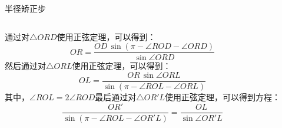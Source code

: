 \documentclass[aspectratio=169]{beamer}
\begin{document}
\begin{frame}{半径矫正步}
\begin{columns}
        通过对$\bigtriangleup ORD$使用正弦定理，可以得到：
        \begin{equation}
            OR = \frac{OD\,\sin\left(\pi - \angle ROD - \angle ORD\right)}{\sin \angle ORD}
        \end{equation}
        然后通过对$\bigtriangleup ORL$使用正弦定理，可以得到：
        \begin{equation}
            OL = \frac{OR\,\sin{\angle ORL}}{\sin\left(\pi - \angle ROL - \angle ORL\right)}
        \end{equation}
        其中，$\angle ROL = 2\angle ROD$最后通过对$\bigtriangleup OR'L$使用正弦定理，可以得到方程：
        \begin{equation}
            \frac{OR'}{\sin\left(\pi - \angle ROL - \angle OR'L\right)} = \frac{OL}{\sin\angle OR'L}
        \end{equation}
    \end{columns}
\end{frame}
\end{document}
